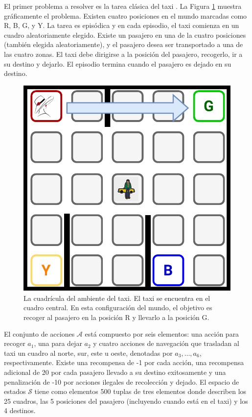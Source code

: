 El primer problema a resolver es la tarea clásica del taxi \cite{Dietterich:2000:HRL:1622262.1622268}.
La Figura \ref{fig:taxi} muestra gráficamente el problema.
Existen cuatro posiciones en el mundo marcadas como R, B, G, y Y. 
La tarea es episódica y en cada episodio, 
el taxi comienza en un cuadro aleatoriamente elegido. 
Existe un pasajero en una de la cuatro posiciones (también elegida
aleatoriamente), y el pasajero desea ser transportado a una de las
cuatro zonas.
El taxi debe dirigirse a la posición del pasajero, recogerlo, ir a su destino y dejarlo.
El episodio termina cuando el pasajero es dejado en su destino.

\begin{figure}[H]
    \centering
    \includegraphics[scale=0.25]{Chapter5/Figs/taxi-env.pdf}
    \caption{La cuadrícula del ambiente del taxi. El taxi se encuentra en el cuadro central. En esta configuración del mundo, el objetivo es recoger al pasajero en la posición R y llevarlo a la posición G.}
    \label{fig:taxi}
\end{figure}

El conjunto de acciones $\mathcal{A}$ está compuesto por seis elementos: una acción para recoger $a_1$, una para dejar $a_2$ y
cuatro acciones de 
navegación que trasladan al taxi un cuadro al norte, sur, 
este u oeste, denotadas por $a_3, \dots, a_6$, respectivamente.
Existe una recompensa de -1 por cada acción, una recompensa adicional de 20 por cada pasajero llevado a su destino 
exitosamente y una penalización de -10 por acciones ilegales
de recolección y dejado.
El espacio de estados $\mathcal{S}$ tiene como elementos 
500 tuplas de tres elementos donde describen los 25 cuadros, las 5 posiciones del pasajero (incluyendo cuando está en el taxi) y los 4 destinos.



